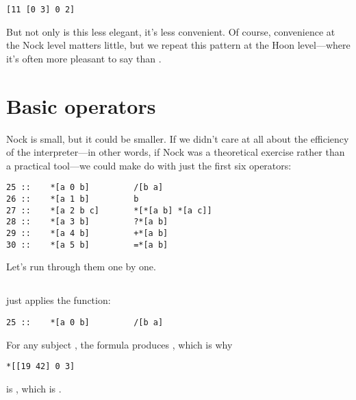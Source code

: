 \begin{framed_shaded}
\begin{Verbatim}[fontsize=\relsize{-2.5},fontseries=b,commandchars=\\\{\}]
[11 [0 3] 0 2]
\end{Verbatim}
\end{framed_shaded}
But not only is this less elegant, it's less convenient.  Of
course, convenience at the Nock level matters little, but we
repeat this pattern at the Hoon level---where it's often more
pleasant to say \kode{[a b]} than .

\section{Basic operators}

Nock is small, but it could be smaller.  If we didn't care at all
about the efficiency of the interpreter---in other words, if Nock
was a theoretical exercise rather than a practical tool---we
could make do with just the first six operators:

\begin{framed_shaded}
\begin{Verbatim}[fontsize=\relsize{-2.5},fontseries=b,commandchars=\\\{\}]
25 ::    *[a 0 b]         /[b a]
26 ::    *[a 1 b]         b
27 ::    *[a 2 b c]       *[*[a b] *[a c]]
28 ::    *[a 3 b]         ?*[a b]
29 ::    *[a 4 b]         +*[a b]
30 ::    *[a 5 b]         =*[a b]
\end{Verbatim}
\end{framed_shaded}
Let's run through them one by one.

\subsection{}

 just applies the \kode{/} function:

\begin{framed_shaded}
\begin{Verbatim}[fontsize=\relsize{-2.5},fontseries=b,commandchars=\\\{\}]
25 ::    *[a 0 b]         /[b a]
\end{Verbatim}
\end{framed_shaded}
For any subject , the formula \kode{[0 b]} produces \kode{/[b a]}, which
is why

\begin{framed_shaded}
\begin{Verbatim}[fontsize=\relsize{-2.5},fontseries=b,commandchars=\\\{\}]
*[[19 42] 0 3]
\end{Verbatim}
\end{framed_shaded}
is \kode{/[3 19 42]}, which is .

